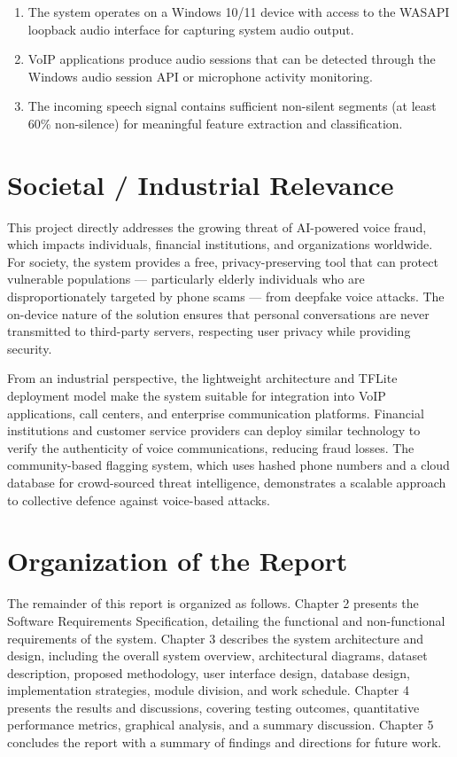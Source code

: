 \documentclass[12pt,a4paper,titlepage]{report}
\begin{document}
	\begin{enumerate}
		\item The system operates on a Windows 10/11 device with access to the WASAPI loopback audio interface for capturing system audio output.
		\item VoIP applications produce audio sessions that can be detected through the Windows audio session API or microphone activity monitoring.
		\item The incoming speech signal contains sufficient non-silent segments (at least 60\% non-silence) for meaningful feature extraction and classification.
	\end{enumerate}
	
	
	\section{Societal / Industrial Relevance}
	
	This project directly addresses the growing threat of AI-powered voice fraud, which impacts individuals, financial institutions, and organizations worldwide. For society, the system provides a free, privacy-preserving tool that can protect vulnerable populations --- particularly elderly individuals who are disproportionately targeted by phone scams --- from deepfake voice attacks. The on-device nature of the solution ensures that personal conversations are never transmitted to third-party servers, respecting user privacy while providing security.
	
	From an industrial perspective, the lightweight architecture and TFLite deployment model make the system suitable for integration into VoIP applications, call centers, and enterprise communication platforms. Financial institutions and customer service providers can deploy similar technology to verify the authenticity of voice communications, reducing fraud losses. The community-based flagging system, which uses hashed phone numbers and a cloud database for crowd-sourced threat intelligence, demonstrates a scalable approach to collective defence against voice-based attacks.
	
	\section{Organization of the Report}
	
	The remainder of this report is organized as follows. Chapter 2 presents the Software Requirements Specification, detailing the functional and non-functional requirements of the system. Chapter 3 describes the system architecture and design, including the overall system overview, architectural diagrams, dataset description, proposed methodology, user interface design, database design, implementation strategies, module division, and work schedule. Chapter 4 presents the results and discussions, covering testing outcomes, quantitative performance metrics, graphical analysis, and a summary discussion. Chapter 5 concludes the report with a summary of findings and directions for future work.
	
\end{document}
